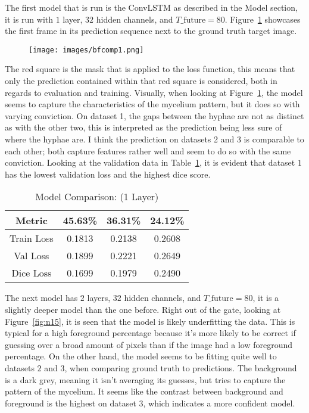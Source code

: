 \documentclass[a4paper,12pt]{article}
\begin{document}
The first model that is run is the ConvLSTM as described in the Model section, it is run with $1$ layer, $32$ hidden channels, and $T\_\text{future} = 80$. Figure~\ref{fig:n14} showcases the first frame in its prediction sequence next to the ground truth target image.
\begin{figure}[H]
\centering
\texttt{[image: images/bfcomp1.png]}
\caption{} %
\label{fig:n14}
\end{figure}
The red square is the mask that is applied to the loss function, this means that only the prediction contained within that red square is considered, both in regards to evaluation and training.
Visually, when looking at Figure~\ref{fig:n14}, the model seems to capture the characteristics of the mycelium pattern, but it does so with varying conviction. On dataset 1, the gaps between the hyphae are not as distinct as with the other two, this is interpreted as the prediction being less sure of where the hyphae are. I think the prediction on datasets 2 and 3 is comparable to each other; both capture features rather well and seem to do so with the same conviction. Looking at the validation data in Table~\ref{tab:1}, it is evident that dataset $1$ has the lowest validation loss and the highest dice score.
\begin{table}[H]
\centering
\caption{Model Comparison: (1 Layer)}
\label{tab:1}
\begin{tabular}{|c|c|c|c|}
\hline
Metric & 45.63\% & 36.31\% & 24.12\% \\
\hline
Train Loss & 0.1813 & 0.2138 & 0.2608 \\
Val Loss   & 0.1899 & 0.2221 & 0.2649 \\
Dice Loss  & 0.1699 & 0.1979 & 0.2490 \\
\hline
\end{tabular}
\end{table}
The next model has $2$ layers, $32$ hidden channels, and $T\_\text{future} = 80$, it is a slightly deeper model than the one before. Right out of the gate, looking at Figure~\ref{fig:n15}, it is seen that the model is likely underfitting the data. This is typical for a high foreground percentage because it's more likely to be correct if guessing over a broad amount of pixels than if the image had a low foreground percentage. On the other hand, the model seems to be fitting quite well to datasets $2$ and $3$, when comparing ground truth to predictions. The background is a dark grey, meaning it isn't averaging its guesses, but tries to capture the pattern of the mycelium. It seems like the contrast between background and foreground is the highest on dataset $3$, which indicates a more confident model.
\end{document}

